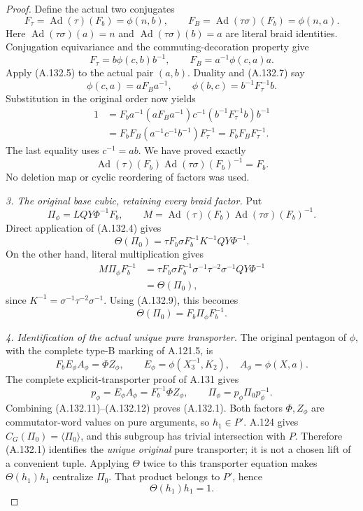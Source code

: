 \begin{proof}
Define the actual two conjugates
\[
 F_\tau=\operatorname{Ad}(\tau)(F_b)=\phi(n,b),\qquad
 F_B=\operatorname{Ad}(\tau\sigma)(F_b)=\phi(n,a).
\]
Here \(\operatorname{Ad}(\tau\sigma)(a)=n\) and
\(\operatorname{Ad}(\tau\sigma)(b)=a\) are literal braid
identities. Conjugation equivariance and the commuting-decoration
property give
\[
 F_\tau=b\phi(c,b)b^{-1},\qquad
 F_B=a^{-1}\phi(c,a)a.
 \tag{A.132.7}
\]
Apply (A.132.5) to the actual pair \((a,b)\). Duality and
(A.132.7) say
\[
 \phi(c,a)=aF_Ba^{-1},\qquad
 \phi(b,c)=b^{-1}F_\tau^{-1}b.
\]
Substitution in the original order now yields
\[
\begin{aligned}
 1
 &=F_ba^{-1}(aF_Ba^{-1})c^{-1}
                   (b^{-1}F_\tau^{-1}b)b^{-1}\\
 &=F_bF_B(a^{-1}c^{-1}b^{-1})F_\tau^{-1}
  =F_bF_BF_\tau^{-1}.
\end{aligned}                                             \tag{A.132.8}
\]
The last equality uses \(c^{-1}=ab\). We have proved exactly
\[
 \operatorname{Ad}(\tau)(F_b)
       \operatorname{Ad}(\tau\sigma)(F_b)^{-1}=F_b.
 \tag{A.132.9}
\]
No deletion map or cyclic reordering of factors was used.

\par\smallskip\noindent\emph{3. The original base cubic, retaining every braid factor.}
Put
\[
 \Pi_\phi=LQY\Phi^{-1}F_b,\qquad
 M=\operatorname{Ad}(\tau)(F_b)
                  \operatorname{Ad}(\tau\sigma)(F_b)^{-1}.
\]
Direct application of (A.132.4) gives
\[
 \Theta(\Pi_0)
   =\tau F_b\sigma F_b^{-1}K^{-1}QY\Phi^{-1}.
\]
On the other hand, literal multiplication gives
\[
\begin{aligned}
 M\Pi_\phi F_b^{-1}
 &=\tau F_b\sigma F_b^{-1}
             \sigma^{-1}\tau^{-2}\sigma^{-1}QY\Phi^{-1}\\
 &=\Theta(\Pi_0),
\end{aligned}                                             \tag{A.132.10}
\]
since \(K^{-1}=\sigma^{-1}\tau^{-2}\sigma^{-1}\).
Using (A.132.9), this becomes
\[
                  \Theta(\Pi_0)=F_b\Pi_\phi F_b^{-1}.
 \tag{A.132.11}
\]

\par\smallskip\noindent\emph{4. Identification of the actual unique pure transporter.}
The original pentagon of \(\phi\), with the complete type-B
marking of A.121.5, is
\[
 F_b E_\phi A_\phi=\Phi Z_\phi,\qquad
 E_\phi=\phi(X_3^{-1},K_2),\quad A_\phi=\phi(X,a).
\]
The complete explicit-transporter proof of A.131 gives
\[
 p_\phi=E_\phi A_\phi=F_b^{-1}\Phi Z_\phi,\qquad
 \Pi_\phi=p_\phi\Pi_0p_\phi^{-1}.
 \tag{A.132.12}
\]
Combining (A.132.11)--(A.132.12) proves (A.132.1).
Both factors \(\Phi,Z_\phi\) are commutator-word values on
pure arguments, so \(h_1\in P'\). A.124 gives
\(C_G(\Pi_0)=\langle\Pi_0\rangle\), and this subgroup has
trivial intersection with \(P\). Therefore (A.132.1) identifies
the \emph{unique original} pure transporter; it is not a chosen
lift of a convenient tuple. Applying \(\Theta\) twice to this
transporter equation makes \(\Theta(h_1)h_1\) centralize
\(\Pi_0\). That product belongs to \(P'\), hence
\[
                         \Theta(h_1)h_1=1.
\]


\end{proof}
